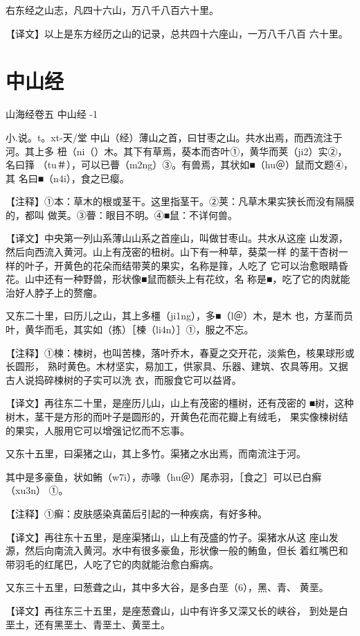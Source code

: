 \documentclass[a4paper,12pt,UTF8,twoside]{ctexbook}
\begin{document}
右东经之山志，凡四十六山，万八千八百六十里。

【译文】以上是东方经历之山的记录，总共四十六座山，一万八千八百 六十里。

\chapter{中山经}

山海经卷五 中山经 -1

小.说。t。xt-天/堂
中山（经）薄山之首，曰甘枣之山。共水出焉，而西流注于河。其上多 杻（ni（）木。其下有草焉，葵本而杏叶①，黄华而荚（ji2）实②，名曰箨 （tu＃），可以已瞢（m2ng）③。有兽焉，其状如■（hu＠）鼠而文题④，其 名曰■（n4i），食之已瘿。

【注释】①本：草木的根或茎干。这里指茎干。②荚：凡草木果实狭长而没有隔膜的，都叫 做荚。③瞢：眼目不明。④■鼠：不详何兽。

【译文】中央第一列山系薄山山系之首座山，叫做甘枣山。共水从这座 山发源，然后向西流入黄河。山上有茂密的杻树。山下有一种草，葵菜一样 的茎干杏树一样的叶子，开黄色的花朵而结带荚的果实，名称是箨，人吃了 它可以治愈眼睛昏花。山中还有一种野兽，形状像■鼠而额头上有花纹，名 称是■，吃了它的肉就能治好人脖子上的赘瘤。

又东二十里，曰历儿之山，其上多橿（ji1ng），多■（l＠）木，是木 也，方茎而员叶，黄华而毛，其实如（拣）［楝（li4n）］①，服之不忘。

【注释】①楝：楝树，也叫苦楝，落叶乔木，春夏之交开花，淡紫色，核果球形或长圆形， 熟时黄色。木材坚实，易加工，供家具、乐器、建筑、农具等用。又据古人说捣碎楝树的子实可以洗 衣，而服食它可以益肾。

【译文】再往东二十里，是座历儿山，山上有茂密的橿树，还有茂密的 ■树，这种树木，茎干是方形的而叶子是圆形的，开黄色花而花瓣上有绒毛， 果实像楝树结的果实，人服用它可以增强记忆而不忘事。

又东十五里，曰渠猪之山，其上多竹。渠猪之水出焉，而南流注于河。

其中是多豪鱼，状如鲔（w7i），赤喙（hu＠）尾赤羽，［食之］可以已白癣（xu3n） ①。

【注释】①癣：皮肤感染真菌后引起的一种疾病，有好多种。

【译文】再往东十五里，是座渠猪山，山上有茂盛的竹子。渠猪水从这 座山发源，然后向南流入黄河。水中有很多豪鱼，形状像一般的鲔鱼，但长 着红嘴巴和带羽毛的红尾巴，人吃了它的肉就能治愈白癣病。

又东三十五里，曰葱聋之山，其中多大谷，是多白垩（6），黑、青、 黄垩。

【译文】再往东三十五里，是座葱聋山，山中有许多又深又长的峡谷， 到处是白垩土，还有黑垩土、青垩土、黄垩土。
\end{document}
